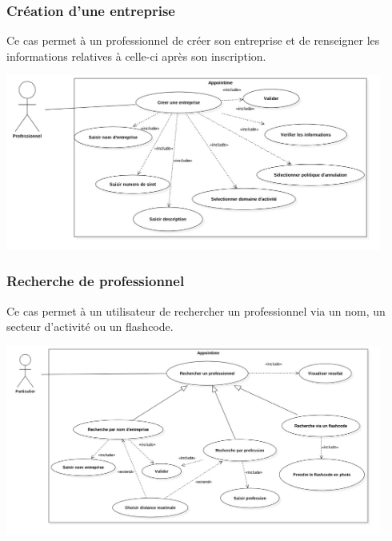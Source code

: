 \documentclass{article}
\begin{document}
\subsubsection{Création d'une entreprise}
Ce cas permet à un professionnel de créer son entreprise et de renseigner les informations relatives à celle-ci après son inscription.
\begin{center}
  \includegraphics[width=350pt]{diagram/useCaseCreerEntreprise}
\end{center}


\subsubsection{Recherche de professionnel}
Ce cas permet à un utilisateur de rechercher un professionnel via un nom, un secteur d'activité ou un flashcode.
\begin{center}
  \includegraphics[width=350pt]{diagram/useCaseRecherchePro}
\end{center}
\end{document}
